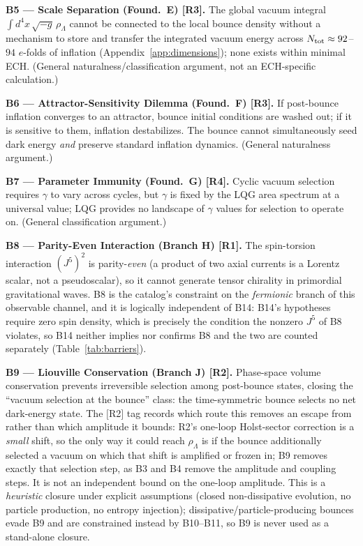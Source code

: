 \documentclass[aps,prd,twocolumn,superscriptaddress,showpacs,preprintnumbers,nofootinbib,longbibliography,floatfix]{revtex4-2}
\begin{document}
\medskip\noindent\textbf{B5 --- Scale Separation (Found.\ E) [R3].} The global vacuum integral
$\int d^4x\,\sqrt{-g}\,\rho_\Lambda$ cannot be connected to the local bounce
density without a mechanism to store and transfer the integrated vacuum energy
across $N_{\rm tot}\approx 92$--$94$ $e$-folds of inflation
(Appendix~\ref{app:dimensions}); none exists within minimal ECH.
(General naturalness/classification argument, not an ECH-specific calculation.)

\medskip\noindent\textbf{B6 --- Attractor-Sensitivity Dilemma (Found.\ F) [R3].} If post-bounce
inflation converges to an attractor, bounce initial conditions are washed out;
if it is sensitive to them, inflation destabilizes. The bounce cannot
simultaneously seed dark energy \textit{and} preserve standard inflation
dynamics. (General naturalness argument.)

\medskip\noindent\textbf{B7 --- Parameter Immunity (Found.\ G) [R4].} Cyclic vacuum selection
requires $\gamma$ to vary across cycles, but $\gamma$ is fixed by the LQG area
spectrum at a universal value; LQG provides no landscape of $\gamma$ values for
selection to operate on. (General classification argument.)

\medskip\noindent\textbf{B8 --- Parity-Even Interaction (Branch H) [R1].}
The spin-torsion interaction $(J^5)^2$ is parity-\textit{even} (a product of two
axial currents is a Lorentz scalar, not a pseudoscalar), so it cannot generate
tensor chirality in primordial gravitational waves. B8 is the catalog's
constraint on the \emph{fermionic} branch of this observable channel, and
it is logically independent of B14: B14's hypotheses require zero spin
density, which is precisely the condition the nonzero $J^5$ of B8
violates, so B14 neither implies nor confirms B8 and the two are counted
separately (Table~\ref{tab:barriers}).

\medskip\noindent\textbf{B9 --- Liouville Conservation (Branch J) [R2].} Phase-space volume
conservation prevents irreversible selection among post-bounce states, closing
the ``vacuum selection at the bounce'' class: the time-symmetric bounce selects
no net dark-energy state. The $[$R2$]$ tag records which route this
removes an escape from rather than which amplitude it bounds: R2's
one-loop Holst-sector correction is a \emph{small} shift, so the only way
it could reach $\rho_\Lambda$ is if the bounce additionally selected a
vacuum on which that shift is amplified or frozen in; B9 removes exactly
that selection step, as B3 and B4 remove the amplitude and coupling
steps. It is not an independent bound on the one-loop amplitude. This is a \emph{heuristic} closure under explicit
assumptions (closed non-dissipative evolution, no particle production, no entropy
injection); dissipative/particle-producing bounces evade B9 and are constrained
instead by B10--B11, so B9 is never used as a stand-alone closure.
\end{document}

